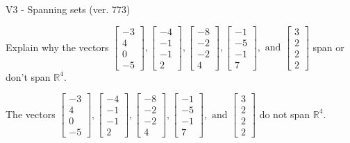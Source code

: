 \begin{exercise}
  \begin{exerciseTitle}V3 - Spanning sets (ver. 773)\end{exerciseTitle}
  \begin{exerciseStatement}
    Explain why the vectors \(\left[\begin{array}{r}
-3 \\
4 \\
0 \\
-5
\end{array}\right] , \left[\begin{array}{r}
-4 \\
-1 \\
-1 \\
2
\end{array}\right] , \left[\begin{array}{r}
-8 \\
-2 \\
-2 \\
4
\end{array}\right] , \left[\begin{array}{r}
-1 \\
-5 \\
-1 \\
7
\end{array}\right] , \text{ and } \left[\begin{array}{r}
3 \\
2 \\
2 \\
2
\end{array}\right]\) span or don't span \(\mathbb{R}^4\). 
	


  \end{exerciseStatement}
  \begin{exerciseAnswer}
   The vectors \(\left[\begin{array}{r}
-3 \\
4 \\
0 \\
-5
\end{array}\right] , \left[\begin{array}{r}
-4 \\
-1 \\
-1 \\
2
\end{array}\right] , \left[\begin{array}{r}
-8 \\
-2 \\
-2 \\
4
\end{array}\right] , \left[\begin{array}{r}
-1 \\
-5 \\
-1 \\
7
\end{array}\right] , \text{ and } \left[\begin{array}{r}
3 \\
2 \\
2 \\
2
\end{array}\right]\) 
  	 do not  
	span \(\mathbb{R}^4\).
  



\end{exerciseAnswer}
\end{exercise}
